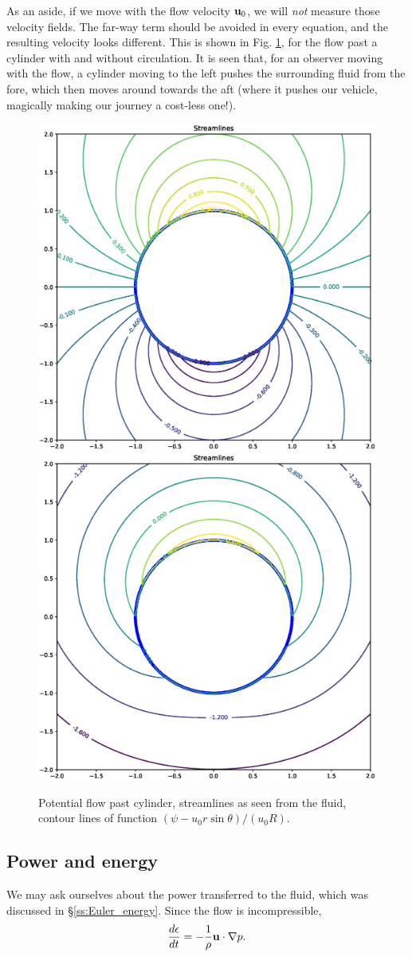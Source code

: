 As an aside, if we move with the flow velocity $\mathbf{u}_0$,
we will \emph{not} measure those velocity fields. The far-way term
should be avoided in every equation, and the resulting velocity looks different.
This is shown in Fig. \ref{fig:potential_flow_past_cylinder_moving}, for the
flow past a cylinder with and without circulation. It is seen that,
for an observer moving with the flow, a cylinder moving to the left
pushes the surrounding fluid from the fore, which then moves around towards the aft
(where it pushes our vehicle, magically making our journey a cost-less one!).

\begin{figure}
  \centering
  \includegraphics[width=0.4\linewidth]{figures/potential_flow_past_cylinder_moving}
  \includegraphics[width=0.4\linewidth]{figures/potential_flow_past_cylinder_rotating_moving}
  \caption{%
  		Potential flow past cylinder, streamlines as seen from the
  		fluid,  contour lines of function $ ( \psi - u_0 r\sin\theta )  / (u_0 R)$.
  	\label{fig:potential_flow_past_cylinder_moving}}
\end{figure}

\subsection{Power and energy}

We may ask ourselves about the power transferred to the fluid, which was discussed in
\S \ref{ss:Euler_energy}. Since the flow is incompressible,
\[
\frac{d \epsilon}{d t} = -\frac{1}{\rho} \mathbf{u} \cdot \nabla p .
\]


